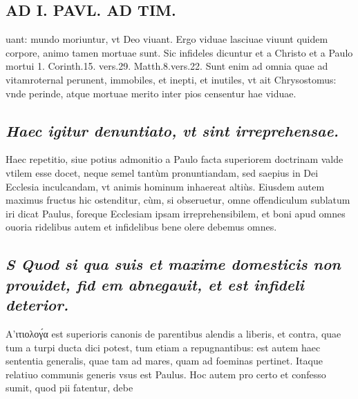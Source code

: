 \documentclass{article}
\begin{document}
\begin{pages}
\section*{AD I. PAVL. AD TIM. }
\marginpar{[ p.264 ]}\pstart uant: mundo moriuntur, vt Deo viuant. Ergo viduae lasciuae viuunt quidem corpore, animo tamen mortuae sunt. Sic infideles dicuntur et a Christo et a Paulo mortui 1. Corinth.15. vers.29. Matth.8.vers.22. Sunt enim ad omnia quae ad vitamroternal perunent, immobiles, et inepti, et inutiles, vt ait Chrysostomus: vnde perinde, atque  mortuae merito inter pios censentur hae viduae.  \pend
{}
{}
\subsection*{\textit{Haec igitur denuntiato, vt sint irreprehensae. }}\pstart Haec repetitio, siue potius admonitio a Paulo facta superiorem doctrinam valde vtilem esse docet, neque semel tantùm pronuntiandam, sed saepius in Dei Ecclesia inculcandam, vt animis hominum inhaereat altiùs. Eiusdem autem maximus fructus hic ostenditur, cùm, si obseruetur, omne offendiculum sublatum iri dicat Paulus, foreque Ecclesiam ipsam irreprehensibilem, et boni apud omnes ouoria ridelibus autem et infidelibus bene olere debemus omnes.  \pend
{}
{}
\subsection*{\textit{S Quod si qua suis et maxime domesticis non prouidet, fid em abnegauit, et est infideli deterior. }}\pstart Α’ιτιολογ́α est superioris canonis de parentibus alendis a liberis, et contra, quae tum a turpi ducta dici potest, tum etiam a repugnantibus: est autem haec sententia generalis, quae tam ad mares, quam ad foeminas pertinet. Itaque relatiuo communis generis vsus est Paulus. Hoc autem pro certo et confesso sumit, quod pii fatentur, debe\pend

\end{pages}
\end{document}
